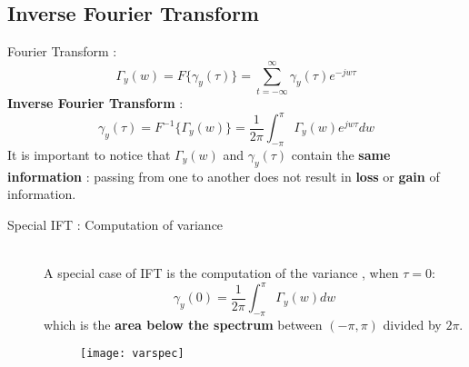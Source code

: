 \subsection{Inverse Fourier Transform}
Fourier Transform : $$ \Gamma_y(w) = F\{\gamma_y(\tau)\} = \sum\limits_{t=-\infty}^{\infty} \gamma_y(\tau)e^{-jw\tau}$$
\textbf{Inverse Fourier Transform} : $$ \gamma_y(\tau) = F^{-1}\{ \Gamma_y(w)\} = \frac{1}{2\pi} \int_{-\pi}^{\pi} \Gamma_y(w)e^{jw\tau}dw $$
It is important to notice that $\Gamma_y(w)$ and $\gamma_y(\tau)$ contain the \textbf{same information} : passing from one to another does not result in \textbf{loss} or \textbf{gain} of information.\\
\begin{description}
\item[Special IFT : Computation of variance]\hfill\\
A special case of IFT is the computation of the variance , when $\tau = 0$:
\[
 \boxed{\gamma_y(0) = \frac{1}{2\pi} \int_{-\pi}^{\pi} \Gamma_y(w) dw}
\]
 which is the \textbf{area below the spectrum} between $ (-\pi,\pi)$ divided by $2\pi$.
\begin{figure}[H]
 \centering
  \texttt{[image: varspec]}
\end{figure}
\end{description}
\newpage
